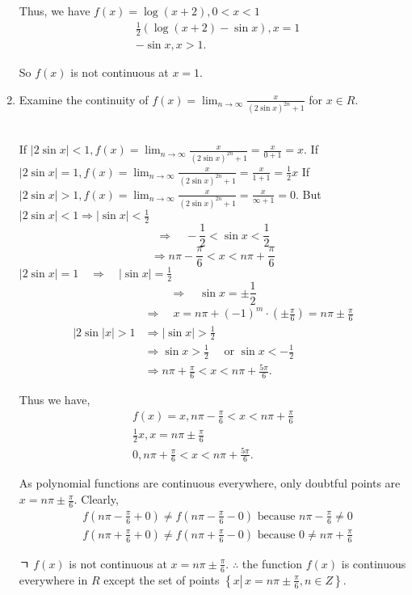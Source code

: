 \begin{enumerate}
\begin{outline}
Thus, we have $f(x)=\log (x+2), 0<x<1$
$$
\begin{aligned}
& \frac{1}{2}(\log (x+2)-\sin x), x=1 \\
&-\sin x, x>1 .
\end{aligned}
$$

So $f(x)$ is not continuous at $x=1$.
\end{outline}

\item Examine the continuity of $f(x)=\lim _{n \rightarrow \infty} \frac{x}{(2 \sin x)^{2 n}+1}$ for $x \in R$.\\\\

\begin{outline}
If $|2 \sin x|<1, f(x)=\lim _{n \rightarrow \infty} \frac{x}{(2 \sin x)^{2 n}+1}=\frac{x}{0+1}=x$.
If $|2 \sin x|=1, f(x)=\lim _{n \rightarrow \infty} \frac{x}{(2 \sin x)^{2 n}+1}=\frac{x}{1+1}=\frac{1}{2} x$
If $|2 \sin x|>1, f(x)=\lim _{n \rightarrow \infty} \frac{x}{(2 \sin x)^{2 n}+1}=\frac{x}{\infty+1}=0$.
But $|2 \sin x|<1 \Rightarrow|\sin x|<\frac{1}{2}$
$$
\Rightarrow \quad-\frac{1}{2}<\sin x<\frac{1}{2}
$$
$$
\Rightarrow n \pi-\frac{\pi}{6}<x<n \pi+\frac{\pi}{6}
$$
$|2 \sin x|=1 \quad \Rightarrow \quad|\sin x|=\frac{1}{2}$
$$
\Rightarrow \quad \sin x= \pm \frac{1}{2}
$$
$$
\begin{aligned}
& \Rightarrow \quad x=n \pi+(-1)^m \cdot\left( \pm \frac{\pi}{6}\right)=n \pi \pm \frac{\pi}{6} \\
|2 \sin | x \mid>1 & \Rightarrow|\sin x|>\frac{1}{2} \\
& \Rightarrow \sin x>\frac{1}{2} \quad \text { or } \sin x<-\frac{1}{2} \\
& \Rightarrow n \pi+\frac{\pi}{6}<x<n \pi+\frac{5 \pi}{6} .
\end{aligned}
$$

Thus we have,
$$
\begin{gathered}
f(x)=x, n \pi-\frac{\pi}{6}<x<n \pi+\frac{\pi}{6} \\
\frac{1}{2} x, x=n \pi \pm \frac{\pi}{6} \\
0, n \pi+\frac{\pi}{6}<x<n \pi+\frac{5 \pi}{6} .
\end{gathered}
$$

As polynomial functions are continuous everywhere, only doubtful points are $x=n \pi \pm \frac{\pi}{6}$. Clearly,
$$
\begin{aligned}
& f\left(n \pi-\frac{\pi}{6}+0\right) \neq f\left(n \pi-\frac{\pi}{6}-0\right) \text { because } n \pi-\frac{\pi}{6} \neq 0 \\
& f\left(n \pi+\frac{\pi}{6}+0\right) \neq f\left(n \pi+\frac{\pi}{6}-0\right) \text { because } 0 \neq n \pi+\frac{\pi}{6}
\end{aligned}
$$

ㄱ $f(x)$ is not continuous at $x=n \pi \pm \frac{\pi}{6}$.
$\therefore$ the function $f(x)$ is continuous everywhere in $R$ except the set of points $\left\{x \left\lvert\, x=n \pi \pm \frac{\pi}{6}\right., n \in Z\right\}$.
\end{outline}
\end{enumerate}
